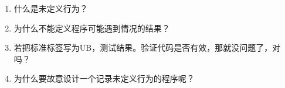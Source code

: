\begin{enumerate}
\item 
什么是未定义行为？

\item 
为什么不能定义程序可能遇到情况的结果？

\item 
若把标准标签写为UB，测试结果。验证代码是否有效，那就没问题了，对吗？

\item
为什么要故意设计一个记录未定义行为的程序呢？

\end{enumerate}